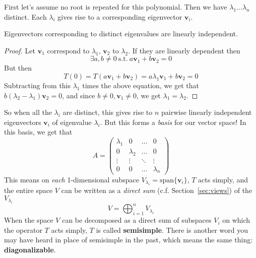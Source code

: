 \begin{appendices}
	First let's assume no root is repeated for this polynomial. Then we have $\lambda_1 \dots \lambda_n$ distinct. Each $\lambda_i$ gives rise to a corresponding eigenvector $\mathbf v_i$.
	\begin{lemma}\label{lemma:distinct_eigenval_spaces_indep}
		Eigenvectors corresponding to distinct eigenvalues are linearly independent. 
	\end{lemma}
	\begin{proof}
		Let $\mathbf v_1$ correspond to $\lambda_1$, $\mathbf v_2$ to $\lambda_2$. If they are linearly dependent then
		\begin{equation}
			\exists a,b \ne 0 ~ \mathrm{s.t.} ~ a \mathbf v_1 + b \mathbf v_2 = 0
		\end{equation}
		But then
		\begin{equation}
			T(0) = T(a \mathbf v_1 + b \mathbf v_2) = a \lambda_1 \mathbf v_1 + b \mathbf v_2 = 0
		\end{equation}
		Subtracting from this $\lambda_1$ times the above equation, we get that $b (\lambda_2 - \lambda_1) \mathbf v_2 = 0$, and since $b \ne 0, \mathbf v_1 \ne 0$, we get $\lambda_1 = \lambda_2$.
	\end{proof}
	So when all the $\lambda_i$ are distinct, this gives rise to $n$ pairwise linearly independent eigenvectors $\mathbf v_i$ of eigenvalue $\lambda_i$. But this forms a \emph{basis} for our vector space! In this basis, we get that 
	\begin{equation}\label{eq:distinct_root_semisimple}
		A = \begin{pmatrix}
			\lambda_1 & 0 & \dots & 0\\
			0 & \lambda_2 &\dots & 0\\
			\vdots & \vdots & \ddots & \vdots\\
			0 & 0 & \dots & \lambda_n
		\end{pmatrix}
	\end{equation}
	This means on \emph{each} 1-dimensional subspace $V_{\lambda_i} = \text{span}\{\mathbf v_i\}$, $T$ acts simply, and the entire space $V$ can be written as a \emph{direct sum} (c.f. Section~\ref{sec:views}) of the $V_{\lambda_i}$
	\begin{equation}
		V = \bigoplus_{i=1}^n V_{\lambda_i}
	\end{equation}
	When the space $V$ can be decomposed as a direct sum of subspaces $V_i$ on which the operator $T$ acts simply, $T$ is called \textbf{semisimple}. There is another word you may have heard in place of semisimple in the past, which means the same thing: \textbf{diagonalizable}. 

\end{appendices}
